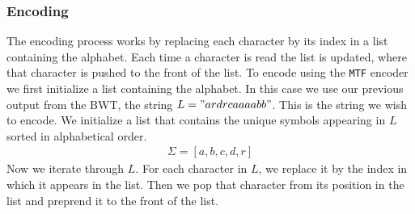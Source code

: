 \documentclass{article}
\begin{document}
\subsubsection{Encoding}
The encoding process works by replacing each character by its index in a list containing the alphabet. Each time a character is read the list is updated, where that character is pushed to the front of the list.
To encode using the \texttt{MTF} encoder we first initialize a list containing the alphabet. In this case we use our previous output from the BWT, the string \(L = "ardrcaaaabb"\). This is the string we wish to encode. We initialize a list that contains the unique symbols appearing in \(L\) sorted in alphabetical order.
\begin{align*}
    \Sigma = [a, b, c, d, r]
\end{align*}
Now we iterate through \(L\). For each character in \(L\), we replace it by the index in which it appears in the list. Then we pop that character from its position in the list and preprend it to the front of the list.
\end{document}
